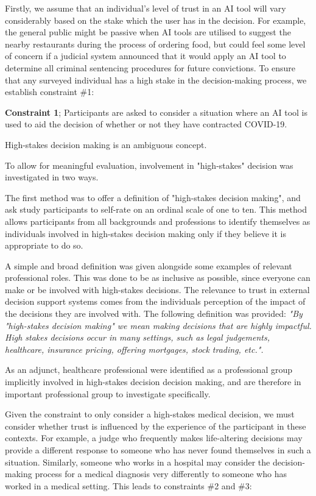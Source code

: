 \documentclass[manuscript,screen,review]{acmart}
\begin{document}
 Firstly, we assume that an individual's level of trust in an AI tool will vary considerably based on the stake which the user has in the decision. For example, the general public might be passive when AI tools are utilised to suggest the nearby restaurants during the process of ordering food, but could feel some level of concern if a judicial system announced that it would apply an AI tool to determine all criminal sentencing procedures for future convictions. To ensure that any surveyed individual has a high stake in the decision-making process, we establish constraint \#1:
 \begin{center}
     \textbf{Constraint 1}; Participants are asked to consider a situation where an AI tool is used to aid the decision of whether or not they have contracted COVID-19.
 \end{center}

High-stakes decision making is an ambiguous concept.

To allow for meaningful evaluation, involvement in "high-stakes" decision was investigated in two ways.

The first method was to offer a definition of "high-stakes decision making", and ask study participants to self-rate on an ordinal scale of one to ten. This method allows participants from all backgrounds and professions to identify themselves as individuals involved in high-stakes decision making only if they believe it is appropriate to do so. 

A simple and broad definition was given alongside some examples of relevant professional roles. This was done to be as inclusive as possible, since everyone can make or be involved with high-stakes decisions. The relevance to trust in external decision support systems comes from the individuals perception of the impact of the decisions they are involved with. The following definition was provided:
\textit{"By "high-stakes decision making" we mean making decisions that are highly impactful. High stakes decisions occur in many settings, such as legal judgements, healthcare, insurance pricing, offering mortgages, stock trading, etc.".}



As an adjunct, healthcare professional were identified as a professional group implicitly involved in high-stakes decision decision making, and are therefore in important professional group to investigate specifically.

Given the constraint to only consider a high-stakes medical decision, we must consider whether trust is influenced by the experience of the participant in these contexts. For example, a judge who frequently makes life-altering decisions may provide a different response to someone who has never found themselves in such a situation. Similarly, someone who works in a hospital may consider the decision-making process for a medical diagnosis very differently to someone who has worked in a medical setting. This leads to constraints \#2 and \#3:
 
\end{document}
